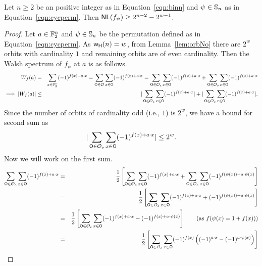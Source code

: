 \documentclass{llncs}
\begin{document}
\begin{theorem}\label{thm:nlboundf}
Let $n \geq 2$ be an positive integer as in Equation~\ref{eqn:binn} and $\psi \in \mathbb{S}_n$ as in Equation~\ref{eqn:cycperm}.
Then $\mathsf{NL}(f_\psi) \ge 2^{n-2} - 2^{w-1}$.
\end{theorem}
\begin{proof}
Let $a \in \mathbb{F}_2^n$ and $\psi \in \mathbb{S}_n$ be the permutation defined as in Equation~\ref{eqn:cycperm}.
As $\mathsf{w_H}(n) = w$, from Lemma~\ref{lem:orbNo} there are $2^w$ orbits with cardinality $1$ and remaining orbits are of even cardinality. 
Then the Walsh spectrum of $f_\psi$ at $a$ is as follows.
\begin{eqnarray} \label{eqn:ws}
W_{f}(a) & =  &\sum_{x \in \mathbb{F}_2^n} (-1)^{f(x)+a \cdot x} 
= \sum_{\mathsf{O} \in \mathcal{O}} \sum_{x \in \mathsf{O}} (-1)^{f(x)+ a \cdot x}
= \sum_{\mathsf{O} \in \mathcal{O}_e} \sum_{x \in \mathsf{O}} (-1)^{ f(x) + a \cdot x} + \sum_{\mathsf{O} \in \mathcal{O}_o} \sum_{x \in \mathsf{O}} (-1)^{ f(x) + a \cdot x} \nonumber \\
\implies |W_{f}(a)| & \leq  & |\sum_{\mathsf{O} \in \mathcal{O}_e} \sum_{x \in \mathsf{O}} (-1)^{ f(x) + a \cdot x}| + | \sum_{\mathsf{O} \in \mathcal{O}_o} \sum_{x \in \mathsf{O}} (-1)^{ f(x) + a \cdot x}|.
\end{eqnarray}
Since the number of orbits of cardinality odd (i.e., $1$) is $2^w$, we have a bound for second sum  as 
\begin{equation}\label{eqn:sumo}
|\sum_{\mathsf{O} \in \mathcal{O}_o} \sum_{x \in \mathsf{O}} (-1)^{ f(x) + a \cdot x}| \leq 2^w. 
\end{equation}
Now we will work on the first sum.
\begin{eqnarray*}
\sum_{\mathsf{O} \in \mathcal{O}_e} \sum_{x \in \mathsf{O}} (-1)^{ f(x) + a \cdot x}  
& = & \frac{1}{2} \left[ \sum_{\mathsf{O} \in \mathcal{O}_e} \sum_{x \in \mathsf{O}} (-1)^{ f(x) + a \cdot x} + \sum_{\mathsf{O} \in \mathcal{O}_e} \sum_{x \in \mathsf{O}} (-1)^{ f(\psi(x)) + a \cdot \psi(x)} \right] \\
& = & \frac{1}{2} \left[ \sum_{\mathsf{O} \in \mathcal{O}_e} \sum_{x \in \mathsf{O}} (-1)^{ f(x) + a \cdot x} + (-1)^{f(\psi(x))+ a \cdot \psi(x)}   \right]  \\
& = & \frac{1}{2}  \left[ \sum_{\mathsf{O} \in \mathcal{O}_e} \sum_{x \in \mathsf{O}} (-1)^{ f(x) + a \cdot x} - (-1)^{f(x) + a \cdot \psi(x)}   \right] ~~~~~~(\text{as }f(\psi(x) = 1+f(x)))\\
& = & \frac{1}{2} \left[ \sum_{\mathsf{O} \in \mathcal{O}_e} \sum_{x \in \mathsf{O}} (-1)^{ f(x)} \left((-1)^{a \cdot x} - (-1)^{ a \cdot \psi(x)}\right) \right]
\end{eqnarray*}

\end{proof}
\end{document}
